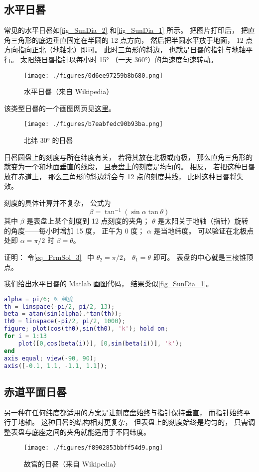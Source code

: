 
\begin{issues}
\end{issues}

\subsection{水平日晷}

常见的水平日晷如\autoref{fig_SunDia_2} 和\autoref{fig_SunDia_1} 所示。 把图片打印后， 把直角三角形的底边垂直固定在半圆的 12 点方向， 然后把半圆水平放于地面， 12 点方向指向正北（地轴北）即可。 此时三角形的斜边， 也就是日晷的指针与地轴平行。 太阳绕日晷指针以每小时 15° （一天 360°）的角速度匀速转动。

\begin{figure}[ht]
\centering
\texttt{[image: ./figures/0d6ee97259b8b680.png]}
\caption{水平日晷（来自 Wikipedia）} \label{fig_SunDia_2}
\end{figure}
该类型日晷的一个画图网页见\href{https://www.blocklayer.com/sundial.aspx}{这里}。
\begin{figure}[ht]
\centering
\texttt{[image: ./figures/b7eabfedc90b93ba.png]}
\caption{北纬 30° 的日晷} \label{fig_SunDia_1}
\end{figure}

日晷圆盘上的刻度与所在纬度有关， 若将其放在北极或南极， 那么直角三角形的就变为一个和地面垂直的线段， 且表盘上的刻度是均匀的。 相反， 若把这种日晷放在赤道上， 那么三角形的斜边将会与 12 点的刻度共线， 此时这种日晷将失效。

刻度的具体计算并不复杂， 公式为
\begin{equation}
\beta = \tan^{-1}(\sin\alpha \tan \theta)
\end{equation}
其中 $\beta$ 是表盘上某个刻度到 12 点刻度的夹角； $\theta$ 是太阳关于地轴（指针）旋转的角度——每小时增加 15 度， 正午为 0 度； $\alpha$ 是当地纬度。 可以验证在北极点处即 $\alpha = \pi/2$ 时 $\beta = \theta$。

证明： 令\autoref{eq_PrmSol_3}~ 中 $\theta_2 = \pi/2$， $\theta_1 = \theta$ 即可。 表盘的中心就是三棱锥顶点。

我们给出水平日晷的 Matlab 画图代码， 结果类似\autoref{fig_SunDia_1}。
\begin{lstlisting}[language=matlab, caption=sunDial.m]
alpha = pi/6; % 纬度
th = linspace(-pi/2, pi/2, 13);
beta = atan(sin(alpha).*tan(th));
th0 = linspace(-pi/2, pi/2, 1000);
figure; plot(cos(th0),sin(th0), 'k'); hold on;
for i = 1:13
    plot([0,cos(beta(i))], [0,sin(beta(i))], 'k');
end
axis equal; view(-90, 90);
axis([-0.1, 1.1, -1.1, 1.1]);
\end{lstlisting}

\subsection{赤道平面日晷}
另一种在任何纬度都适用的方案是让刻度盘始终与指针保持垂直， 而指针始终平行于地轴。 这种日晷的结构相对更复杂， 但表盘上的刻度始终是均匀的， 只需调整表盘与底座之间的夹角就能适用于不同纬度。
\begin{figure}[ht]
\centering
\texttt{[image: ./figures/f8902853bbff54d9.png]}
\caption{故宫的日晷（来自 Wikipedia）} \label{fig_SunDia_3}
\end{figure}

